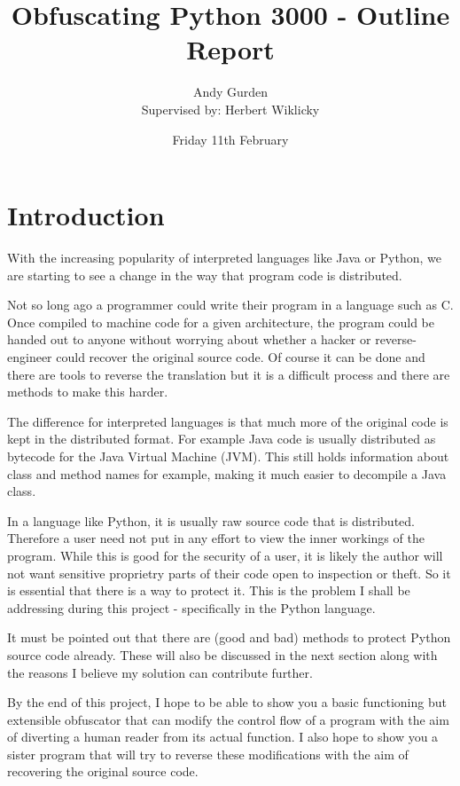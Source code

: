 \documentclass{report}
\title{Obfuscating Python 3000 - Outline Report}
\author{Andy Gurden\\Supervised by: Herbert Wiklicky}
\date{Friday 11th February}
\begin{document}
\maketitle

\section{Introduction}

With the increasing popularity of interpreted languages like Java or Python, we are starting
to see a change in the way that program code is distributed.

Not so long ago a programmer could write their program in a language such as C. Once compiled
to machine code for a given architecture, the program could be handed out to anyone without
worrying about whether a hacker or reverse-engineer could recover the original source code.
Of course it can be done and there are tools to reverse the translation\cite{cdecomp} but it
is a difficult process and there are methods to make this harder\cite{disres}.

The difference for interpreted languages is that much more of the original code is kept in the
distributed format. For example Java code is usually distributed as bytecode for the Java Virtual
Machine (JVM). This still holds information about class and method names for example\cite{classinfo},
making it much easier to decompile a Java class.

In a language like Python, it is usually raw source code that is distributed. Therefore a
user need not put in any effort to view the inner workings of the program. While this is good
for the security of a user\cite{noobf}, it is likely the author will not want sensitive
proprietry parts of their code open to inspection or theft. So it is essential that there is a
way to protect it. This is the problem I shall be addressing during this project - specifically
in the Python language.

It must be pointed out that there are (good and bad) methods to protect Python source code already.
These will also be discussed in the next section along with the reasons I believe my solution can
contribute further.

By the end of this project, I hope to be able to show you a basic functioning but extensible obfuscator
that can modify the control flow of a program with the aim of diverting a human reader from its actual
function. I also hope to show you a sister program that will try to reverse these modifications with the
aim of recovering the original source code.
\end{document}
